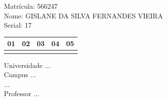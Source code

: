 \documentclass[10pt,a4paper,twocolumn]{report}
\begin{document}
Matrícula: 566247\\ Nome: GISLANE DA SILVA FERNANDES VIEIRA \\ Serial: 17\\
\begin{tabular}{|l|l|l|l|l|}\hline
01  &02  &03  &04  &05 \\ \hline 
 & & & & \\ \hline 
\end{tabular}
 \cleardoublepage 

\begin{flushleft}
Universidade ...\\
Campus ...\\
...\\
Professor ...\\
\end{flushleft}
\end{document}
